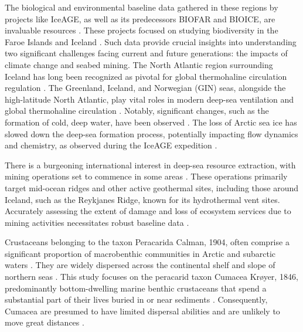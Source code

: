The biological and environmental baseline data gathered in these regions by projects like IceAGE, as well as its predecessors BIOFAR and BIOICE, are invaluable resources \citep{meisner_prefacebiodiversity_2018}. These projects focused on studying biodiversity in the Faroe Islands and Iceland \citep{meisner_prefacebiodiversity_2018}. Such data provide crucial insights into understanding two significant challenges facing current and future generations: the impacts of climate change and seabed mining. The North Atlantic region surrounding Iceland has long been recognized as pivotal for global thermohaline circulation regulation \citep{meisner_prefacebiodiversity_2018}. The Greenland, Iceland, and Norwegian (GIN) seas, alongside the high-latitude North Atlantic, play vital roles in modern deep-sea ventilation and global thermohaline circulation \citep{johannessen_relationship_1994}. Notably, significant changes, such as the formation of cold, deep water, have been observed \citep{meisner_prefacebiodiversity_2018}. The loss of Arctic sea ice has slowed down the deep-sea formation process, potentially impacting flow dynamics and chemistry, as observed during the IceAGE expedition \citep{meisner_prefacebiodiversity_2018}.

There is a burgeoning international interest in deep-sea resource extraction, with mining operations set to commence in some areas \citep{mengerink_call_2014}. These operations primarily target mid-ocean ridges and other active geothermal sites, including those around Iceland, such as the Reykjanes Ridge, known for its hydrothermal vent sites. Accurately assessing the extent of damage and loss of ecosystem services due to mining activities necessitates robust baseline data \citep{meisner_prefacebiodiversity_2018}.

Crustaceans belonging to the taxon Peracarida Calman, 1904, often comprise a significant proportion of macrobenthic communities in Arctic and subarctic waters \citep{uhlir_adding_2021}. They are widely dispersed across the continental shelf and slope of northern seas \citep{uhlir_adding_2021}. This study focuses on the peracarid taxon Cumacea Krøyer, 1846, predominantly bottom-dwelling marine benthic crustaceans that spend a substantial part of their lives buried in or near sediments \citep{uhlir_adding_2021}. Consequently, Cumacea are presumed to have limited dispersal abilities and are unlikely to move great distances \citep{uhlir_adding_2021}.

